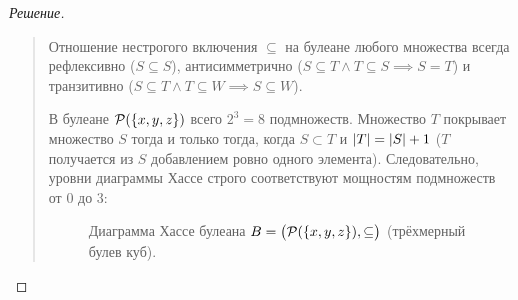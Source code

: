 \begin{proof}[Решение]~\\
    \begin{quote}
        Отношение нестрогого включения $\subseteq$ на булеане любого 
        множества всегда рефлексивно ($S \subseteq S$), антисимметрично 
        ($S \subseteq T \land T \subseteq S \implies S = T$) и транзитивно 
        ($S \subseteq T \land T \subseteq W \implies S \subseteq W$).

        В булеане $\mathcal{P}(\{x, y, z\})$ всего $2^3 = 8$ подмножеств. 
        Множество $T$ покрывает множество $S$ тогда и только тогда, когда 
        $S \subset T$ и $\left| T \right| = \left| S \right| + 1$ ($T$ получается из $S$ 
        добавлением ровно одного элемента). Следовательно, уровни диаграммы 
        Хассе строго соответствуют мощностям подмножеств от $0$ до $3$:

        \begin{figure}[H]
            \centering
            \caption{Диаграмма Хассе булеана 
            $B = \bigl(\mathcal{P}(\{x, y, z\}), \subseteq\bigr)$ 
            (трёхмерный булев куб).}
        \end{figure}
    \end{quote}
\end{proof}

